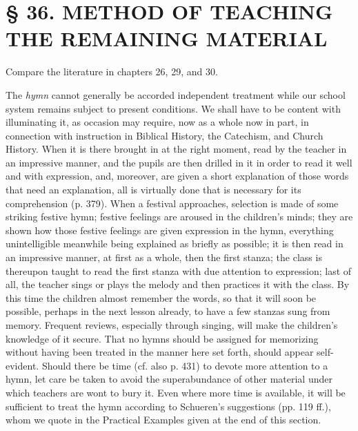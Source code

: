 \chapter[§ 36. TEACHING THE REMAINING MATERIAL]{§ 36. METHOD OF TEACHING THE REMAINING MATERIAL}

Compare the literature in chapters 26, 29, and 30.

The \emph{hymn} cannot generally be accorded independent treatment while our school system remains subject to present conditions. We shall have to be content with illuminating it, as occasion may require, now as a whole now in part, in connection with instruction in Biblical History, the Catechism, and Church History. When it is there brought in at the right moment, read by the teacher in an impressive manner, and the pupils are then drilled in it in order to read it well and with expression, and, moreover, are given a short explanation of those words that need an explanation, all is virtually done that is necessary for its comprehension (p. 379). When a festival approaches, selection is made of some striking festive hymn; festive feelings are aroused in the children's minds; they are shown how those festive feelings are given expression in the hymn, everything unintelligible meanwhile being explained as briefly as possible; it is then read in an impressive manner, at first as a whole, then the first stanza; the class is thereupon taught to read the first stanza with due attention to expression; last of all, the teacher sings or plays the melody and then practices it with the class. By this time the children almost remember the words, so that it will soon be possible, perhaps in the next lesson already, to have a few stanzas sung from memory. Frequent reviews, especially through singing, will make the children's knowledge of it secure. That no hymns should be assigned for memorizing without having been treated in the manner here set forth, should appear self-evident. Should there be time (cf. also p. 431) to devote more attention to
a hymn, let care be taken to avoid the superabundance of other material under which teachers are wont to bury it. Even where more time is available, it will be sufficient to treat the hymn according to Schueren’s suggestions (pp. 119 ff.), whom we quote in the Practical Examples given at the end of this section.

